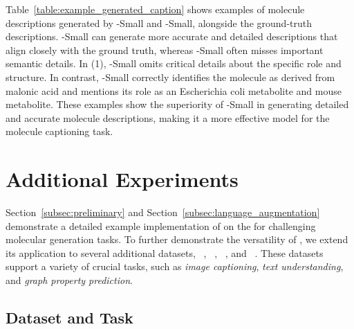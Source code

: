 Table~\ref{table:example_generated_caption} shows examples of molecule descriptions generated by \oldmodel-Small and \newmodel-Small, alongside the ground-truth descriptions. \newmodel-Small can generate more accurate and detailed descriptions that align closely with the ground truth, whereas \oldmodel-Small often misses important semantic details.
% 
In (1), \oldmodel-Small omits critical details about the specific role and structure. 
In contrast, \newmodel-Small correctly identifies the molecule as derived from malonic acid and mentions its role as an Escherichia coli metabolite and mouse metabolite.
% 
These examples show the superiority of \newmodel-Small in generating detailed and accurate molecule descriptions, making it a more effective model for the molecule captioning task.

\section{Additional Experiments}
\label{sec:appendix_additional_experiments}

Section~\ref{subsec:preliminary} and Section~\ref{subsec:language_augmentation} demonstrate a detailed example implementation of \pipeline on the \olddataset for challenging molecular generation tasks. 
To further demonstrate the versatility of \pipeline, we extend its application to several additional datasets, \bace~\cite{HFZDRLCL20}, \hiv~\cite{HFZDRLCL20}, \esol~\cite{HFZDRLCL20}, and \image~\cite{SDGS18}. 
These datasets support a variety of crucial tasks, such as \emph{image captioning}, \emph{text understanding}, and \emph{graph property prediction}.

\subsection{Dataset and Task}
\label{subsec:appendix_dataset_and_task}


